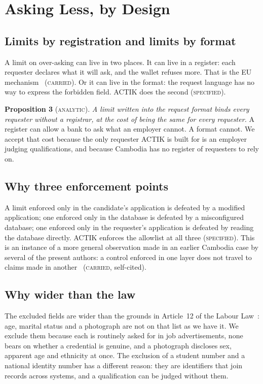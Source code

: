 \documentclass[10pt,a4paper,twocolumn]{article}
\newcommand{\kind}[1]{\textsc{#1}}
\begin{document}
\section{Asking Less, by Design}
\label{sec:asking}

\subsection{Limits by registration and limits by format}

A limit on over-asking can live in two places. It can live in a register: each
requester declares what it will ask, and the wallet refuses more. That is the EU
mechanism~\citep{eu2025848} (\kind{carried}). Or it can live in the format: the
request language has no way to express the forbidden field. ACTIK does the second
(\kind{specified}).

\textbf{Proposition 3} (\kind{analytic}). \emph{A limit written into the request
format binds every requester without a registrar, at the cost of being the same
for every requester.} A register can allow a bank to ask what an employer cannot.
A format cannot. We accept that cost because the only requester ACTIK is built
for is an employer judging qualifications, and because Cambodia has no register
of requesters to rely on.

\subsection{Why three enforcement points}

A limit enforced only in the candidate's application is defeated by a modified
application; one enforced only in the database is defeated by a misconfigured
database; one enforced only in the requester's application is defeated by
reading the database directly. ACTIK enforces the allowlist at all three
(\kind{specified}). This is an instance of a more general observation made in an
earlier Cambodia case by several of the present authors: a control enforced in
one layer does not travel to claims made in another~\citep{chay2026stages}
(\kind{carried}, self-cited).

\subsection{Why wider than the law}

The excluded fields are wider than the grounds in Article~12 of the Labour
Law~\citep{khlabourlaw}: age, marital status and a photograph are not on that list
as we have it. We exclude them because each is routinely asked for in job
advertisements, none bears on whether a credential is genuine, and a photograph
discloses sex, apparent age and ethnicity at once. The exclusion of a student
number and a national identity number has a different reason: they are
identifiers that join records across systems, and a qualification can be judged
without them.
\end{document}
